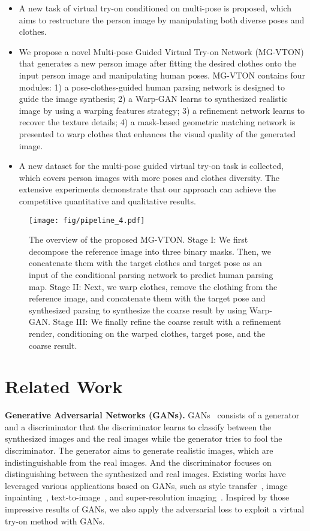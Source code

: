 \documentclass[10pt,twocolumn,letterpaper]{article}
\begin{document}
\begin{itemize}
\item A new task of virtual try-on conditioned on multi-pose is proposed, which aims to restructure the person image by manipulating both diverse poses and clothes.
\item We propose a novel Multi-pose Guided Virtual Try-on Network (MG-VTON) that generates a new person image after fitting the desired clothes onto the input person image and manipulating human poses. MG-VTON contains four modules: 1) a pose-clothes-guided human parsing network is designed to guide the image synthesis; 2) a Warp-GAN learns to synthesized realistic image by using a warping features strategy; 3) a refinement network learns to recover the texture details; 4) a mask-based geometric matching network is presented to warp clothes that enhances the visual quality of the generated image.
\item A new dataset for the multi-pose guided virtual try-on task is collected, which covers person images with more poses and clothes diversity. The extensive experiments demonstrate that our approach can achieve the competitive quantitative and qualitative results.
\end{itemize}

\begin{figure*}[!ht]
\centering
\texttt{[image: fig/pipeline\_4.pdf]} 
\caption{The overview of the proposed MG-VTON. Stage I: We first decompose the reference image into three binary masks. Then, we concatenate them with the target clothes and target pose as an input of the conditional parsing network to predict human parsing map. Stage II: Next, we warp clothes, remove the clothing from the reference image, and concatenate them with the target pose and synthesized parsing to synthesize the coarse result by using Warp-GAN. Stage III: We finally refine the coarse result with a refinement render, conditioning on the warped clothes, target pose, and the coarse result.}
\label{fig:test_pipeline}
\vspace{-4mm}
\end{figure*}

\section{Related Work}
\textbf{Generative Adversarial Networks (GANs).} 
GANs~\cite{goodfellow2014generative} consists of a generator and a discriminator that the discriminator learns to classify between the synthesized images and the real images while the generator tries to fool the discriminator. The generator aims to generate realistic images, which are indistinguishable from the real images. And the discriminator focuses on distinguishing between the synthesized and real images. Existing works have leveraged various applications based on GANs, such as style transfer~\cite{isola2017pix2pix,zhu2017cycleGAN,kim2017discoGAN,yi2017dualgan}, image inpainting~\cite{Yang2017inpainting}, text-to-image~\cite{reed2016text2image}, and super-resolution imaging~\cite{ledig2016photo}. Inspired by those impressive results of GANs, we also apply the adversarial loss to exploit a virtual try-on method with GANs.
\end{document}
